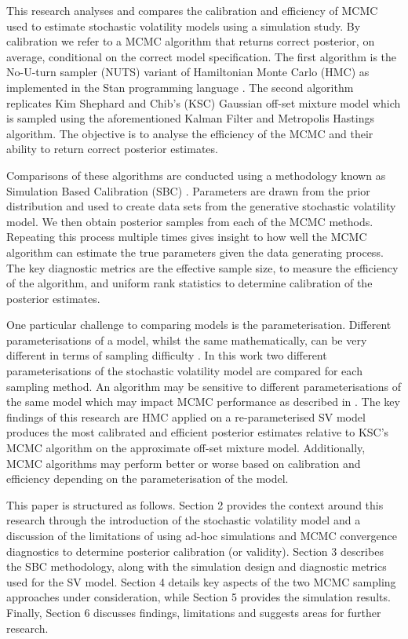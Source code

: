 \documentclass[12pt, a4paper]{article}
\begin{document}
    This research analyses and compares the calibration and efficiency of MCMC used to estimate stochastic volatility models using a simulation study. By calibration we refer to a MCMC algorithm that returns correct posterior, on average, conditional on the correct model specification. The first algorithm is the No-U-turn sampler (NUTS) variant of Hamiltonian Monte Carlo (HMC) as implemented in the Stan programming language \citep{hoffman2014no, betancourt2017conceptual, stan}. The second algorithm replicates Kim Shephard and Chib's (KSC) Gaussian off-set mixture model which is sampled using the aforementioned Kalman Filter and Metropolis Hastings algorithm. The objective is to analyse the efficiency of the MCMC and their ability to return correct posterior estimates.

    Comparisons of these algorithms are conducted using a methodology known as Simulation Based Calibration (SBC) \citep{talts2020validating}. Parameters are drawn from the prior distribution and used to create data sets from the generative stochastic volatility model. We then obtain posterior samples from each of the MCMC methods. Repeating this process multiple times gives insight to how well the MCMC algorithm can estimate the true parameters given the data generating process. The key diagnostic metrics are the effective sample size, to measure the efficiency of the algorithm, and uniform rank statistics to determine calibration of the posterior estimates. 

    One particular challenge to comparing models is the parameterisation. Different parameterisations of a model, whilst the same mathematically, can be very different in terms of sampling difficulty \citep{neal2003slice}. In this work two different parameterisations of the stochastic volatility model are compared for each sampling method. An algorithm may be sensitive to different parameterisations of the same model which may impact MCMC performance as described in \citet{strickland2008parameterisation}. The key findings of this research are HMC applied on a re-parameterised SV model produces the most calibrated and efficient posterior estimates relative to KSC's MCMC algorithm on the approximate off-set mixture model. Additionally, MCMC algorithms may perform better or worse based on calibration and efficiency depending on the parameterisation of the model.

    This paper is structured as follows. Section 2 provides the context around this research through the introduction of the stochastic volatility model and a discussion of the limitations of using ad-hoc simulations and MCMC convergence diagnostics to determine posterior calibration (or validity). Section 3 describes the SBC methodology, along with the simulation design and diagnostic metrics used for the SV model. Section 4 details key aspects of the two MCMC sampling approaches under consideration, while Section 5 provides the simulation results. Finally, Section 6 discusses findings, limitations and suggests areas for further research.
\end{document}
